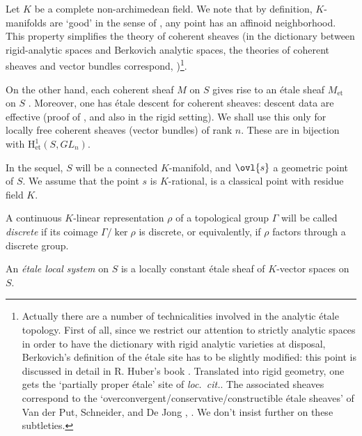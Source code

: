 \begin{para}\label{para::3.4.2} Let $K$ be a complete non-archimedean
 field. We note that by definition, $K$-manifolds are `good' in the
 sense of \cite[1.2.6]{ecfnas}, \ie any point has an affinoid
 neighborhood. This property simplifies the theory of coherent sheaves
 (in the dictionary between rigid-analytic spaces and Berkovich analytic
 spaces, the theories of coherent sheaves and vector bundles correspond,
 \cf \cite[1.3.4, 1.6]{ecfnas})\footnote{Actually there are a number of
 technicalities involved in the analytic \'etale topology. First of all,
 since we restrict our attention to strictly analytic spaces in order to
 have the dictionary with rigid analytic varieties at disposal,
 Berkovich's definition of the \'etale site has to be slightly modified:
 this point is discussed in detail in R. Huber's book
 \cite[8.3]{ecoravaas}. Translated into rigid geometry, one gets the
 `partially proper \'etale' site of {\it loc.~cit.}. The associated
 sheaves correspond to the `overconvergent/conservative/constructible
 \'etale sheaves' of Van 
 der Put, Schneider, and De Jong \cite{jong96:_etale}, \cf
 \cite[8.2.12]{ecoravaas}. 
 We don't insist further on these subtleties.}.

 On the other hand, each coherent sheaf $M$ on $S$ gives rise to an
 \'etale sheaf $ M_{\mathrm{et}} $ on $S$ \cite[4.1.2]{ecfnas}.
 Moreover, one has \'etale descent for coherent sheaves: descent data are
 effective (\cf proof of \cite[4.1.10]{ecfnas}, and also
 \cite[3.2.3]{jong96:_etale} in the rigid setting). We shall use this only for
 locally free coherent sheaves (vector bundles) of rank $n$. These are
 in bijection with $\mathrm{H}^1_{\mathrm{et}}(S, GL_n)$.
  
\medskip In the sequel, $S$ will be a connected $K$-manifold, and $\ovl{s}$ a
geometric point of $S$. We assume that the point $s$ is $K$-rational,
 \ie is a classical point with residue field $K$.
\end{para}

\begin{para}\label{para::3.4.3} A continuous $K$-linear representation $\rho$
 of a topological group $\Gamma$ will be called {\it discrete} if its
 coimage $\Gamma/\ker \rho$ is discrete, or equivalently, if $\rho$
 factors through a discrete group.

 An {\it \'etale local system} on $S$ is a locally constant \'etale sheaf
 of $K$-vector spaces on $S$.
\end{para}

